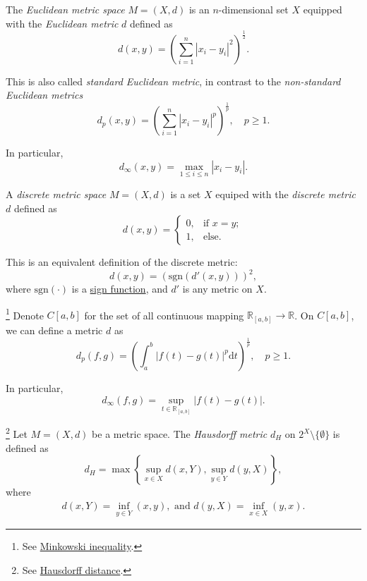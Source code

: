 \begin{example}
	The \textit{Euclidean metric space} $M = (X, d)$ is an $n$-dimensional set $X$ equipped with the \textit{Euclidean metric} $d$ defined as
	$$
	d(x,y) = \left( \sum_{i = 1}^n |x_i - y_i|^2 \right)^\frac{1}{2}.
	$$
	
	This is also called \textit{standard Euclidean metric}, in contrast to the \textit{non-standard Euclidean metrics}
	$$
	d_p(x,y) = \left( \sum_{i = 1}^n |x_i - y_i|^p \right)^\frac{1}{p}, \quad p \ge 1.
	$$
	
	In particular,
	$$
	d_\infty (x,y) = \max_{1 \le i \le n} |x_i - y_i|.
	$$
\end{example}


\begin{example}
	A \textit{discrete metric space} $M = (X, d)$ is a set $X$ equiped with the \textit{discrete metric} $d$ defined as
	$$
	d(x,y) =
	\begin{cases}
		0, & \text{if $x = y$}; \\
		1, & \text{else}.
	\end{cases}
	$$
	
	This is an equivalent definition of the discrete metric:
	$$
	d(x, y) = (\mathrm{sgn}(d'(x,y)))^2,
	$$
	where $\mathrm{sgn}(\cdot)$ is a \href{https://en.wikipedia.org/wiki/Sign_function}{sign function}, and $d'$ is any metric on $X$.
\end{example}


\begin{example}
	\footnote{
		See \href{https://en.wikipedia.org/wiki/Minkowski_inequality}{Minkowski inequality}.
	}
	Denote $C[a,b]$ for the set of all continuous mapping $\mathbb R_{[a,b]} \to \mathbb R$. On $C[a,b]$, we can define a metric $d$ as
	$$
	d_p(f, g) = \left( \int_{a}^{b} |f(t) - g(t)|^p \mathrm{d} t \right)^\frac{1}{p}, \quad p \ge 1.
	$$
	
	In particular,
	$$
	d_\infty (f,g) = \sup_{t \in \mathbb R_{[a,b]}} |f(t) - g(t)|.
	$$
\end{example}


\begin{example}
	\footnote{
		See \href{https://en.wikipedia.org/wiki/Hausdorff_distance}{Hausdorff distance}.
	}
	Let $M = (X, d)$ be a metric space. The \textit{Hausdorff metric} $d_H$ on $2^X \setminus \{\emptyset\}$ is defined as
	$$
	d_H = \max \left\{ \sup_{x \in X}d(x,Y), \sup_{y \in Y} d(y, X)\right\},
	$$
	where
	$$
	\begin{aligned}
		d(x,Y) = \inf_{y \in Y}(x,y), \text{ and } d(y, X) = \inf_{x \in X} (y, x).
	\end{aligned}
	$$
\end{example}


